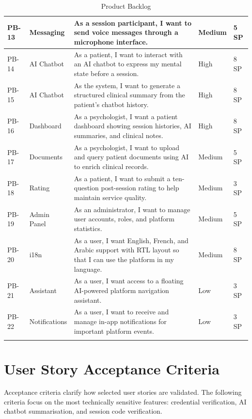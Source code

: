 \documentclass[a4paper,12pt]{report}
\begin{document}
\begin{longtable}{@{} L{1.1cm} L{2.7cm} L{7.2cm} L{1.8cm} L{1.6cm} @{}}
\midrule
PB-13 & Messaging & As a session participant, I want to send voice messages through a microphone interface. & Medium & 5 SP \\
\midrule
PB-14 & AI Chatbot & As a patient, I want to interact with an AI chatbot to express my mental state before a session. & High & 8 SP \\
\midrule
PB-15 & AI Chatbot & As the system, I want to generate a structured clinical summary from the patient's chatbot history. & High & 8 SP \\
\midrule
PB-16 & Dashboard & As a psychologist, I want a patient dashboard showing session histories, AI summaries, and clinical notes. & High & 8 SP \\
\midrule
PB-17 & Documents & As a psychologist, I want to upload and query patient documents using AI to enrich clinical records. & Medium & 5 SP \\
\midrule
PB-18 & Rating & As a patient, I want to submit a ten-question post-session rating to help maintain service quality. & Medium & 3 SP \\
\midrule
PB-19 & Admin Panel & As an administrator, I want to manage user accounts, roles, and platform statistics. & Medium & 5 SP \\
\midrule
PB-20 & i18n & As a user, I want English, French, and Arabic support with RTL layout so that I can use the platform in my language. & Medium & 8 SP \\
\midrule
PB-21 & Assistant & As a user, I want access to a floating AI-powered platform navigation assistant. & Low & 3 SP \\
\midrule
PB-22 & Notifications & As a user, I want to receive and manage in-app notifications for important platform events. & Low & 3 SP \\

\bottomrule
\caption{Product Backlog}
\label{tab:backlog}\\
\end{longtable}
\normalsize

\section{User Story Acceptance Criteria}

Acceptance criteria clarify how selected user stories are validated. The following criteria focus on the most technically sensitive features: credential verification, AI chatbot summarisation, and session code verification.
\end{document}
